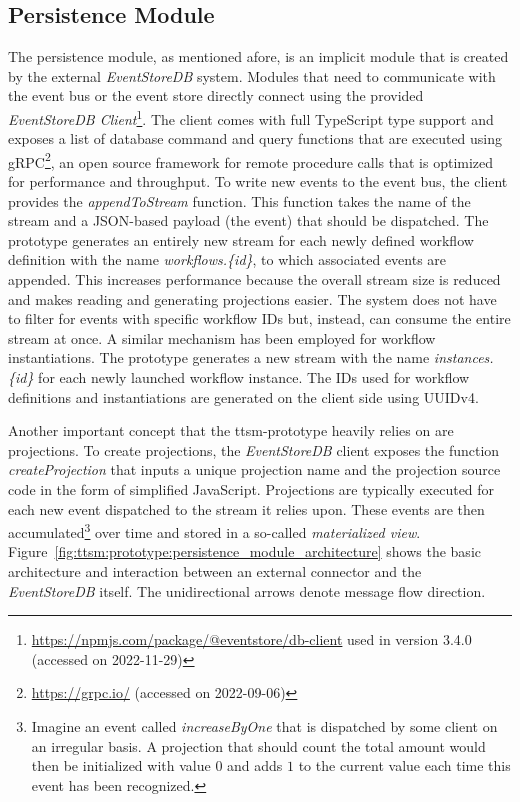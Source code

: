 \subsection{Persistence Module}
\label{sec:ttsm:prototype:persistence_module}
The persistence module, as mentioned afore, is an implicit module that is created by the external \textit{EventStoreDB} system. Modules that need to communicate with the event bus or the event store directly connect using the provided \textit{EventStoreDB Client}\footnote{\url{https://npmjs.com/package/@eventstore/db-client} used in version 3.4.0 (accessed on 2022-11-29)}. The client comes with full TypeScript type support and exposes a list of database command and query functions that are executed using gRPC\footnote{\url{https://grpc.io/} (accessed on 2022-09-06)}, an open source framework for remote procedure calls that is optimized for performance and throughput. To write new events to the event bus, the client provides the \textit{appendToStream} function. This function takes the name of the stream and a JSON-based payload (the event) that should be dispatched. The prototype generates an entirely new stream for each newly defined workflow definition with the name \textit{workflows.\{id\}}, to which associated events are appended. This increases performance because the overall stream size is reduced and makes reading and generating projections easier. The system does not have to filter for events with specific workflow IDs but, instead, can consume the entire stream at once. A similar mechanism has been employed for workflow instantiations. The prototype generates a new stream with the name \textit{instances.\{id\}} for each newly launched workflow instance. The IDs used for workflow definitions and instantiations are generated on the client side using UUIDv4.

Another important concept that the \gls{ttsm}-prototype heavily relies on are projections. To create projections, the \textit{EventStoreDB} client exposes the function \textit{createProjection} that inputs a unique projection name and the projection source code in the form of simplified JavaScript. Projections are typically executed for each new event dispatched to the stream it relies upon. These events are then accumulated\footnote{Imagine an event called \textit{increaseByOne} that is dispatched by some client on an irregular basis. A projection that should count the total amount would then be initialized with value $0$ and adds $1$ to the current value each time this event has been recognized.} over time and stored in a so-called \textit{materialized view}. Figure~\ref{fig:ttsm:prototype:persistence_module_architecture} shows the basic architecture and interaction between an external connector and the \textit{EventStoreDB} itself. The unidirectional arrows denote message flow direction.

